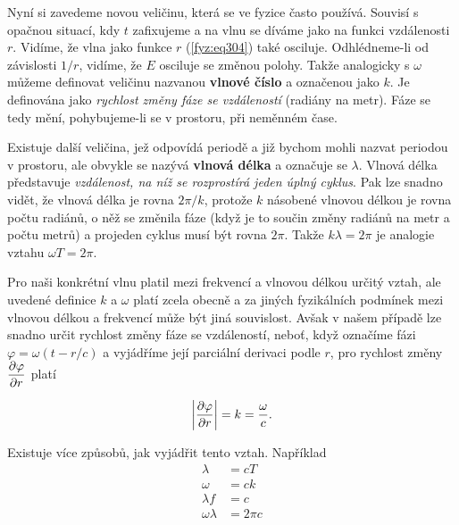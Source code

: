     Nyní si zavedeme novou veličinu, která se ve fyzice často používá. Souvisí s opačnou situací, 
    kdy \(t\) zafixujeme a na vlnu se díváme jako na funkci vzdálenosti \(r\). Vidíme, že vlna jako 
    funkce \(r\) (\ref{fyz:eq304}) také osciluje. Odhlédneme-li od závislosti \(1/r\), vidíme, že 
    \(E\) osciluje se změnou polohy. Takže analogicky s \(\omega\) můžeme definovat veličinu 
    nazvanou \textbf{vlnové číslo} a označenou jako \(k\). Je definována jako \emph{rychlost změny 
    fáze se vzdáleností} (radiány na metr). Fáze se tedy mění, pohybujeme-li se v prostoru, při 
    neměnném čase.
    
    Existuje další veličina, jež odpovídá periodě a již bychom mohli nazvat periodou v prostoru, 
    ale obvykle se nazývá \textbf{vlnová délka} a označuje se \(\lambda\). Vlnová délka představuje 
    \emph{vzdálenost, na níž se rozprostírá jeden úplný cyklus}. Pak lze snadno vidět, že vlnová 
    délka je rovna \(2\pi/k\), protože \(k\) násobené vlnovou délkou je rovna počtu radiánů, o něž 
    se změnila fáze (když je to součin změny radiánů na metr a počtu metrů) a projeden cyklus musí 
    být rovna \(2\pi\). Takže \(k\lambda=2\pi\) je analogie vztahu \(\omega T= 2\pi\).
    
    Pro naši konkrétní vlnu platil mezi frekvencí a vlnovou délkou určitý vztah, ale uvedené 
    definice \(k\) a \(\omega\) platí zcela obecně a za jiných fyzikálních podmínek mezi vlnovou 
    délkou a frekvencí může být jiná souvislost. Avšak v našem případě lze snadno určit rychlost 
    změny fáze se vzdáleností, neboť, když označíme fázi \(\varphi=\omega(t-r/c)\) a vyjádříme její 
    parciální derivaci podle \(r\), pro rychlost změny \(\dfrac{\partial \varphi}{\partial r}\) platí
    
    \begin{equation}\label{fyz:eq305}
      \left\lvert\dfrac{\partial \varphi}{\partial r}\right\rvert = k = \frac{\omega}{c}.
    \end{equation}
    
    Existuje více způsobů, jak vyjádřit tento vztah. Například
    \begin{subequations}\label{fyz:eq306}
      \begin{align}
        \lambda        &= cT      \label{fyz:eq306a}  \\
        \omega         &= ck      \label{fyz:eq306b}  \\
        \lambda f      &= c       \label{fyz:eq306c}  \\
        \omega\lambda  &= 2\pi c  \label{fyz:eq306d}  
      \end{align}
    \end{subequations}
    
